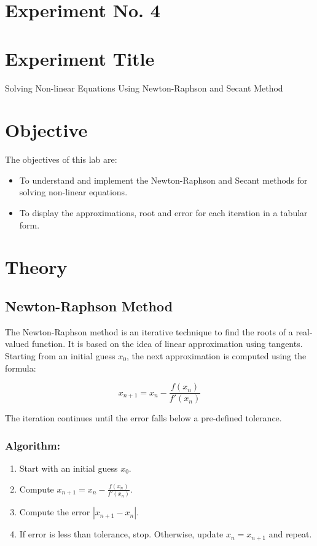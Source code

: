 \documentclass[a4paper,12pt]{article}
\begin{document}
	\section{Experiment No. 4}
	
	\section{Experiment Title }
Solving Non-linear Equations Using Newton-Raphson and Secant Method
	\section{Objective}
	
	The objectives of this lab are:
	\begin{itemize}
	\item To understand and implement the Newton-Raphson and Secant methods for solving non-linear equations.
	\item To display the approximations, root and error for each iteration in a tabular form.
		
	\end{itemize}
	\section{Theory}
	
	\subsection{Newton-Raphson Method}
	The Newton-Raphson method is an iterative technique to find the roots of a real-valued function. It is based on the idea of linear approximation using tangents. Starting from an initial guess $x_0$, the next approximation is computed using the formula:
	
	\[
	x_{n+1} = x_n - \frac{f(x_n)}{f'(x_n)}
	\]
	
	The iteration continues until the error falls below a pre-defined tolerance.
	
	\subsubsection{Algorithm:}
	\begin{enumerate}
		\item Start with an initial guess $x_0$.
		\item Compute $x_{n+1} = x_n - \frac{f(x_n)}{f'(x_n)}$.
		\item Compute the error $|x_{n+1} - x_n|$.
		\item If error is less than tolerance, stop. Otherwise, update $x_n = x_{n+1}$ and repeat.
	\end{enumerate}
	
\end{document}
